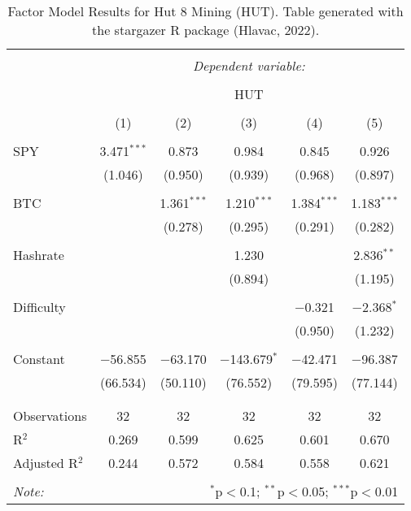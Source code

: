 
\begin{table}[!htbp] \centering 
  \caption{Factor Model Results for Hut 8 Mining (HUT). Table generated with the stargazer R package (Hlavac, 2022).} 
  \label{ModelResults_HUT} 
\large 
\begin{tabular}{@{\extracolsep{5pt}}lccccc} 
\\[-1.8ex]\hline 
\hline \\[-1.8ex] 
 & \multicolumn{5}{c}{\textit{Dependent variable:}} \\ 
\cline{2-6} 
\\[-1.8ex] & \multicolumn{5}{c}{HUT} \\ 
\\[-1.8ex] & (1) & (2) & (3) & (4) & (5)\\ 
\hline \\[-1.8ex] 
 SPY & 3.471$^{***}$ & 0.873 & 0.984 & 0.845 & 0.926 \\ 
  & (1.046) & (0.950) & (0.939) & (0.968) & (0.897) \\ 
  & & & & & \\ 
 BTC &  & 1.361$^{***}$ & 1.210$^{***}$ & 1.384$^{***}$ & 1.183$^{***}$ \\ 
  &  & (0.278) & (0.295) & (0.291) & (0.282) \\ 
  & & & & & \\ 
 Hashrate &  &  & 1.230 &  & 2.836$^{**}$ \\ 
  &  &  & (0.894) &  & (1.195) \\ 
  & & & & & \\ 
 Difficulty &  &  &  & $-$0.321 & $-$2.368$^{*}$ \\ 
  &  &  &  & (0.950) & (1.232) \\ 
  & & & & & \\ 
 Constant & $-$56.855 & $-$63.170 & $-$143.679$^{*}$ & $-$42.471 & $-$96.387 \\ 
  & (66.534) & (50.110) & (76.552) & (79.595) & (77.144) \\ 
  & & & & & \\ 
\hline \\[-1.8ex] 
Observations & 32 & 32 & 32 & 32 & 32 \\ 
R$^{2}$ & 0.269 & 0.599 & 0.625 & 0.601 & 0.670 \\ 
Adjusted R$^{2}$ & 0.244 & 0.572 & 0.584 & 0.558 & 0.621 \\ 
\hline 
\hline \\[-1.8ex] 
\textit{Note:}  & \multicolumn{5}{r}{$^{*}$p$<$0.1; $^{**}$p$<$0.05; $^{***}$p$<$0.01} \\ 
\end{tabular} 
\end{table} 
